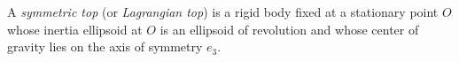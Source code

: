 A \textit{symmetric top} (or \textit{Lagrangian top}) is a rigid body fixed at a stationary point $O$ whose inertia ellipsoid at $O$ is an ellipsoid of revolution and whose center of gravity lies on the axis of symmetry $e_3$.

